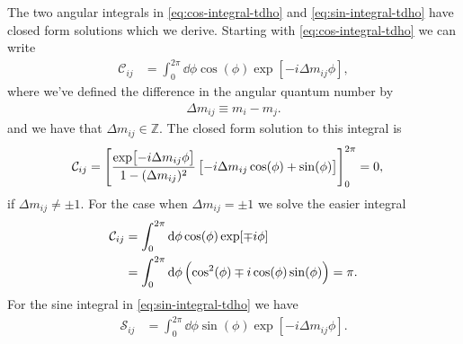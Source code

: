             The two angular integrals in \autoref{eq:cos-integral-tdho} and
            \autoref{eq:sin-integral-tdho} have closed form solutions which we
            derive.
            Starting with \autoref{eq:cos-integral-tdho} we can write
            \begin{align}
                \mathcal{C}_{ij}
                &=
                \int_{0}^{2\pi}
                \dd \phi
                \cos(\phi)
                \exp[-i\Delta m_{ij} \phi],
            \end{align}
            where we've defined the difference in the angular quantum number by
            \begin{align}
                \Delta m_{ij} \equiv m_i - m_j.
                \label{eq:diff-m-tdqd}
            \end{align}
            and we have that $\Delta m_{ij} \in \mathbb{Z}$.
            The closed form solution to this integral is
            \begin{align}
                \mathcal{C}_{ij}
                &= \left[ 
                    \frac{\exp[-i\Delta m_{ij} \phi]}{1 - (\Delta m_{ij})^2}
                    \left[ 
                        -i\Delta m_{ij} \cos(\phi)
                        + \sin(\phi)
                     \right]
                 \right]_{0}^{2\pi}
                = 0,
                \label{eq:dipole-x-tdqd}
            \end{align}
            if $\Delta m_{ij} \neq \pm 1$.
            For the case when $\Delta m_{ij} = \pm 1$ we solve the easier
            integral
            \begin{align}
                \mathcal{C}_{ij}
                &=
                \int_{0}^{2\pi}
                \dd \phi
                \cos(\phi) \exp[\mp i\phi]
                \\
                &=
                \int_{0}^{2\pi}
                \dd \phi
                \left( 
                    \cos^2(\phi)
                    \mp i\cos(\phi)\sin(\phi)
                 \right)
                = \pi.
            \end{align}
            For the sine integral in \autoref{eq:sin-integral-tdho} we have
            \begin{align}
                \mathcal{S}_{ij}
                &=
                \int_{0}^{2\pi}
                \dd\phi
                \sin(\phi)
                \exp[-i\Delta m_{ij} \phi].
            \end{align}
